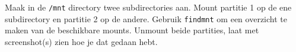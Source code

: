 Maak in de \texttt{/mnt} directory twee subdirectories aan. Mount partitie 1 op de ene subdirectory en partitie 2 op de andere. Gebruik \texttt{findmnt} om een overzicht te maken van de beschikbare mounts. Unmount beide partities, laat met screenshot(s) zien hoe je dat gedaan hebt.

